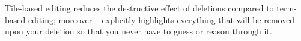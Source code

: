 Tile-based editing reduces the destructive effect of deletions
compared to term-based editing; moreover \tylr~ explicitly
highlights everything that will be removed upon your deletion
so that you never have to guess or reason through it.










